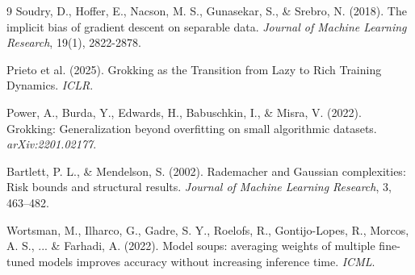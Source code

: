 \documentclass[11pt,a4paper]{article}
\theoremstyle{definition}
\theoremstyle{plain}
\theoremstyle{remark}
\begin{document}
\begin{thebibliography}{9}
Soudry, D., Hoffer, E., Nacson, M. S., Gunasekar, S., \& Srebro, N. (2018).
\newblock The implicit bias of gradient descent on separable data.
\newblock \emph{Journal of Machine Learning Research}, 19(1), 2822-2878.

Prieto et al. (2025).
\newblock Grokking as the Transition from Lazy to Rich Training Dynamics.
\newblock \emph{ICLR}.

Power, A., Burda, Y., Edwards, H., Babuschkin, I., \& Misra, V. (2022).
\newblock Grokking: Generalization beyond overfitting on small algorithmic datasets.
\newblock \emph{arXiv:2201.02177}.

Bartlett, P. L., \& Mendelson, S. (2002).
\newblock Rademacher and Gaussian complexities: Risk bounds and structural results.
\newblock \emph{Journal of Machine Learning Research}, 3, 463--482.

Wortsman, M., Ilharco, G., Gadre, S. Y., Roelofs, R., Gontijo-Lopes, R., Morcos, A. S., ... \& Farhadi, A. (2022).
\newblock Model soups: averaging weights of multiple fine-tuned models improves accuracy without increasing inference time.
\newblock \emph{ICML}.
\end{thebibliography}
\end{document}
